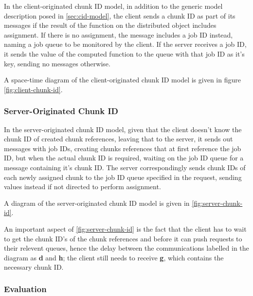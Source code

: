 In the client-originated chunk ID  model, in addition to the generic model
description posed in \cref{sec:cid-model}, the client sends a chunk ID
as part of its messages if the result of the function on the distributed object
includes assignment.
If there is no assignment, the message includes a job ID instead, naming a job
queue to be monitored by the client.
If the server receives a job ID, it sends the value of the computed function to
the queue with that job ID as it's key, sending no messages otherwise.

A space-time diagram of the client-originated chunk ID model is given in figure
\cref{fig:client-chunk-id}.


\subsubsection{Server-Originated Chunk ID}

In the server-originated chunk ID model, given that the client doesn't know the
chunk ID of created chunk references, leaving that to the server, it sends out
messages with job IDs, creating chunks references that at first reference the
job ID, but when the actual chunk ID is required, waiting on the job ID queue
for a message containing it's chunk ID.
The server correspondingly sends chunk IDs of each newly assigned chunk to the
job ID queue specified in the request, sending values instead if not directed
to perform assignment.

A diagram of the server-originated chunk ID model is given in \cref{fig:server-chunk-id}.


An important aspect of \cref{fig:server-chunk-id} is the fact that the client has to
wait to get the chunk ID's of the chunk references  and 
before it can push requests to their relevent queues, hence the delay between
the communications labelled in the diagram as \textcolor{dark2-3}{\textbf{d}}
and \textcolor{dark2-3}{\textbf{h}}; the client still needs to receive
\textcolor{dark2-1}{\textbf{g}}, which contains the necessary chunk ID.

\subsubsection{Evaluation}\label{sec:mod-eval}

